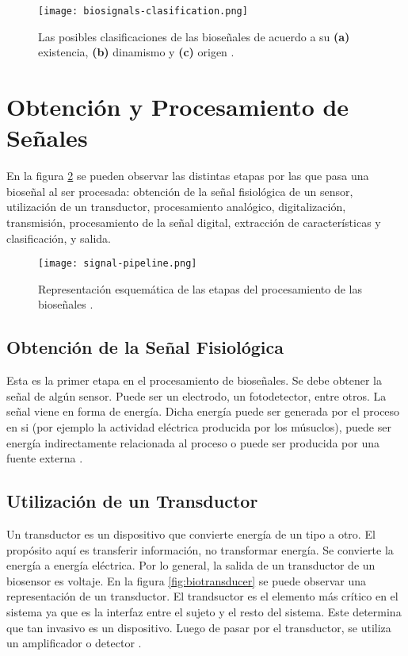 \begin{figure}[H]
	\centering
    \texttt{[image: biosignals-clasification.png]}
    \caption{Las posibles clasificaciones de las bioseñales de acuerdo a su \textbf{(a)} existencia, \textbf{(b)} dinamismo y \textbf{(c)} origen \cite{biosignal-book-2}.}
	\label{fig:biosignals-clasification}
\end{figure}

\section{Obtención y Procesamiento de Señales}

En la figura \ref{fig:signal-pipeline} se pueden observar las distintas etapas por las que pasa una bioseñal al ser procesada: obtención de la señal fisiológica de un sensor, utilización de un transductor, procesamiento analógico, digitalización, transmisión, procesamiento de la señal digital, extracción de características y clasificación, y salida.

\begin{figure}[H]
	\centering
    \texttt{[image: signal-pipeline.png]}
    \caption{Representación esquemática de las etapas del procesamiento de las bioseñales \cite{biosignal-book}.}
	\label{fig:signal-pipeline}
\end{figure}

\subsection{Obtención de la Señal Fisiológica}

Esta es la primer etapa en el procesamiento de bioseñales. Se debe obtener la señal de algún sensor. Puede ser un electrodo, un fotodetector, entre otros. La  señal viene en forma de energía. Dicha energía puede ser generada por el proceso en si (por ejemplo la actividad eléctrica producida por los músuclos), puede ser energía indirectamente relacionada al proceso o puede ser producida por una fuente externa \cite{biosignal-book}.

\subsection{Utilización de un Transductor}

Un transductor es un dispositivo que convierte energía de un tipo a otro. El propósito aquí es transferir información, no transformar energía. Se convierte la energía a energía eléctrica. Por lo general, la salida de un transductor de un biosensor es voltaje. En la figura \ref{fig:biotransducer} se puede observar una representación de un transductor. El trandsuctor es el elemento más crítico en el sistema ya que es la interfaz entre el sujeto y el resto del sistema. Este determina que tan invasivo es un dispositivo. Luego de pasar por el transductor, se utiliza un amplificador o detector \cite{biosignal-book}.

